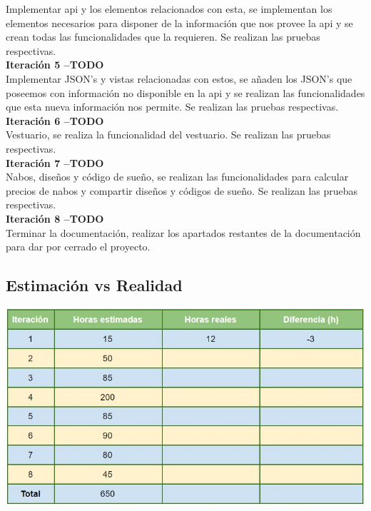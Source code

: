 Implementar api y los elementos relacionados con esta, se implementan los elementos necesarios para disponer de la información que nos provee la api y se crean todas las funcionalidades que la requieren. Se realizan las pruebas respectivas.\\

\textbf{Iteración 5 --TODO}\\

Implementar JSON’s y vistas relacionadas con estos, se añaden los JSON’s que poseemos con información no disponible en la api y se realizan las funcionalidades que esta nueva información nos permite. Se realizan las pruebas respectivas.\\

\textbf{Iteración 6 --TODO}\\

Vestuario, se realiza la funcionalidad del vestuario. Se realizan las pruebas respectivas.\\

\textbf{Iteración 7 --TODO}\\

Nabos, diseños y código de sueño, se realizan las funcionalidades para calcular precios de nabos y compartir diseños y códigos de sueño. Se realizan las pruebas respectivas.\\

\textbf{Iteración 8 --TODO}\\

Terminar la documentación, realizar los apartados restantes de la documentación para dar por cerrado el proyecto.\\

\subsection{Estimación vs Realidad}

\includegraphics[width=\textwidth]{img/cap4/analisistiempo.jpg}


